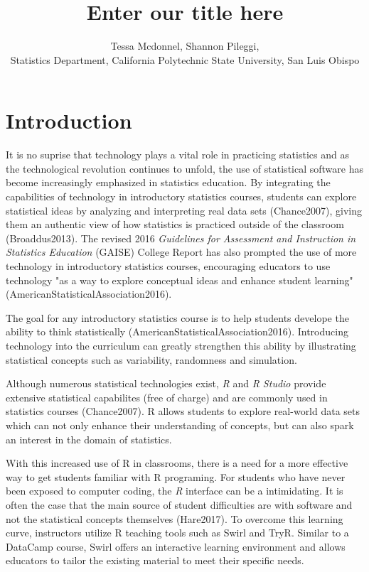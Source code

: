 \documentclass{tise_style}
\title{Enter our title here}
\author{Tessa Mcdonnel, Shannon Pileggi,  \\Statistics Department, California Polytechnic State University, San Luis Obispo}
\begin{document}
\section{Introduction}

It is no suprise that technology plays a vital role in practicing statistics and as the technological revolution continues to 
unfold, the use of statistical software has become increasingly emphasized in statistics education. By integrating the 
capabilities of technology in introductory statistics courses, students can explore statistical ideas by analyzing and 
interpreting real data sets (Chance2007), giving them an authentic view of how statistics is practiced outside of the 
classroom (Broaddus2013). The revised 2016 \textit{Guidelines for Assessment and Instruction in Statistics Education} (GAISE) 
College Report has also prompted the use of more technology in introductory statistics courses, encouraging educators to use technology "as a way to explore conceptual ideas and enhance student learning" (AmericanStatisticalAssociation2016).



The goal for any introductory statistics course is to help students develope the ability to think statistically (AmericanStatisticalAssociation2016). 
Introducing technology into the curriculum can greatly strengthen this ability by illustrating statistical concepts such as variability, randomness and simulation.

Although numerous statistical technologies exist, \textit{R} and \textit{R Studio} provide extensive statistical capabilites (free of charge) and are commonly used in statistics courses (Chance2007). R allows students to explore real-world data sets which can not only enhance their understanding of concepts, but can also spark an interest in the domain of statistics.


With this increased use of R in classrooms, there is a need for a more effective way to get students familiar with R 
programing.
For students who have never been exposed to computer coding, the \textit{R} interface can be a intimidating. It is often the 
case that the main source of student difficulties are with software and not the statistical concepts themselves (Hare2017). To 
overcome this learning curve, instructors utilize R teaching tools such as Swirl and TryR. Similar to a DataCamp course, Swirl
offers an interactive learning environment and allows educators to tailor the existing material to meet their specific needs. 
\end{document}
